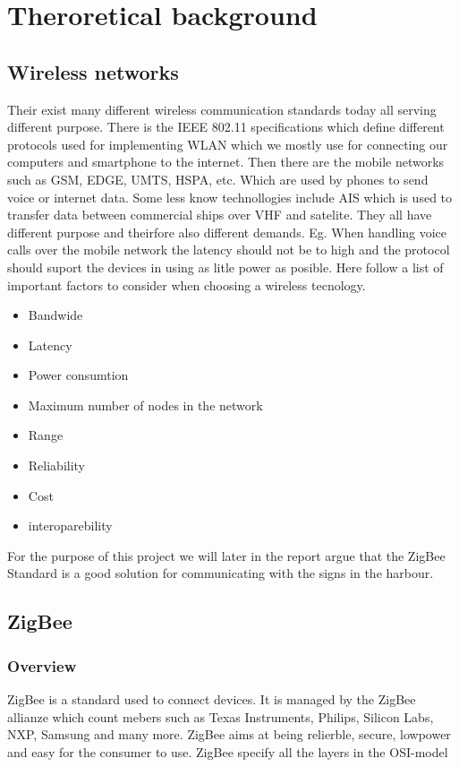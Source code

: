 \documentclass[a4paper,12pt,english]{article}
\begin{document}
\section{Theroretical background}
\subsection{Wireless networks}
Their exist many different wireless communication standards today all serving
different purpose. There is the IEEE 802.11 specifications which define
different protocols used for implementing WLAN which we mostly use for
connecting our computers and smartphone to the internet. Then there are the
mobile networks such as GSM, EDGE, UMTS, HSPA, etc. Which are used by phones to
send voice or internet data. Some less know technollogies include AIS
 which is used to transfer
data between commercial ships over VHF and satelite. They all have different
purpose and theirfore also different demands. Eg. When handling voice calls
over the mobile network the latency should not be to high and the protocol
should suport the devices in using as litle power as posible. Here follow a list
of important factors to consider when choosing a wireless tecnology.
\begin{itemize}
  \item Bandwide
  \item Latency
  \item Power consumtion
  \item Maximum number of nodes in the network
  \item Range
  \item Reliability
  \item Cost
  \item interoparebility 
\end{itemize}

For the purpose of this project we will later in the report argue that the
ZigBee Standard is a good solution for communicating with the signs in the
harbour.

\subsection{ZigBee}
\subsubsection{Overview}
ZigBee is a standard used to connect devices. It is managed by the ZigBee
allianze which count mebers such as Texas Instruments, Philips, Silicon
Labs, NXP, Samsung and many more. ZigBee aims at being relierble, secure,
lowpower and easy for the consumer to use. ZigBee specify all the layers
in the OSI-model 
\end{document}
